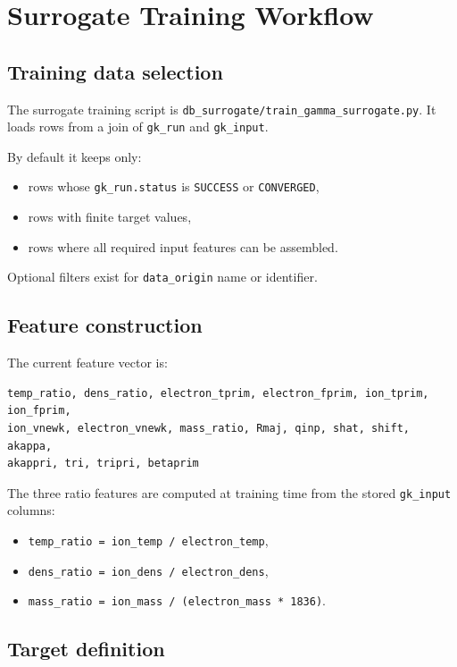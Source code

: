 \documentclass[11pt]{article}
\newcommand{\code}[1]{\texttt{#1}}
\begin{document}
\section{Surrogate Training Workflow}

\subsection{Training data selection}

The surrogate training script is \code{db\_surrogate/train\_gamma\_surrogate.py}.
It loads rows from a join of \code{gk\_run} and \code{gk\_input}.

By default it keeps only:

\begin{itemize}
\item rows whose \code{gk\_run.status} is \code{SUCCESS} or \code{CONVERGED},
\item rows with finite target values,
\item rows where all required input features can be assembled.
\end{itemize}

Optional filters exist for \code{data\_origin} name or identifier.

\subsection{Feature construction}

The current feature vector is:

\begin{verbatim}
temp_ratio, dens_ratio, electron_tprim, electron_fprim, ion_tprim, ion_fprim,
ion_vnewk, electron_vnewk, mass_ratio, Rmaj, qinp, shat, shift, akappa,
akappri, tri, tripri, betaprim
\end{verbatim}

The three ratio features are computed at training time from the stored
\code{gk\_input} columns:

\begin{itemize}
\item \code{temp\_ratio = ion\_temp / electron\_temp},
\item \code{dens\_ratio = ion\_dens / electron\_dens},
\item \code{mass\_ratio = ion\_mass / (electron\_mass * 1836)}.
\end{itemize}

\subsection{Target definition}
\end{document}

